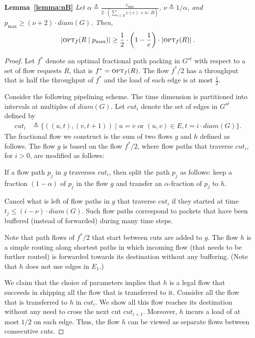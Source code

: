 \documentclass[11pt]{article}
\newcommand{\opt}{\text{\textsc{opt}}}
\newcommand{\pmax}{p_{\max}}
\newcommand{\eqdf}{\triangleq}
\newenvironment{proof sketch}[1]{\noindent {\emph{Proof sketch of #1:}}}{\hfill \qed}
\newcommand{\cut}{\textit{cut}}
\newcommand{\diam}{\textit{diam}}
\begin{document}
\textbf{Lemma~\ref{lemma:nB}} \emph{Let $\alpha\eqdf\frac{c_{\min}}{2\cdot
    (\sum_{e\in E} c(e)+n\cdot B)}$, $\nu\eqdf1/\alpha$, and $\pmax\geq
  (\nu+2)\cdot \diam(G)$.  Then, $$|\opt_f(R \mid \pmax)| \geq \frac
  1{2} \cdot \left(1-\frac 1e\right) \cdot |\opt_f(R)|\:.$$}

\begin{proof}
  Let $f^*$ denote an optimal fractional path packing in $G^{st}$ with respect to a set of flow
  requests $R$, that is $f^* = \opt_f(R)$.   The flow $f^*/2$ has a
  throughput that is half the throughput of $f^*$ and the load of each edge
  is at most $\frac {1}{2}$.

  Consider the following pipelining scheme. The time dimension is partitioned into
  intervals at multiples of $\diam(G)$. Let $\cut_i$ denote the set of edges in $G^{st}$ defined by
  \begin{align*}
    \cut_i &\triangleq \{ ((u,t),(v,t+1)) \mid u=v \text { or } (u,v)\in E, t=i\cdot \diam(G)\}.
  \end{align*}
  The fractional flow we construct is the sum of two flows $g$ and $h$
  defined as follows.  The flow $g$ is based on the flow $f^*/2$,
  where flow paths that traverse $\cut_i$, for $i>0$, are modified as
  follows:
  \begin{inparaenum}[(i)]
  \item If a flow path $p_j$ in $g$ traverses $\cut_i$, then split the
    path $p_j$ as follows: keep a fraction $(1-\alpha)$ of $p_j$ in
    the flow $g$ and transfer an $\alpha$-fraction of $p_j$ to $h$.
  \item Cancel what is left of flow paths in $g$ that traverse
    $\cut_i$ if they started at time $t_j\leq (i-\nu) \cdot \diam(G)$.
    Such flow paths correspond to packets that have been buffered
    (instead of forwarded) during many time steps.
  \end{inparaenum}
  Note that path flows of $f^*/2$ that start between cuts are added
  to $g$. The flow $h$ is a simple routing along shortest paths in which incoming
  flow (that needs to be further routed) is forwarded towards its
  destination without any buffering. (Note that $h$ does not use edges in $E_1$.)

  We claim that the choice of parameters implies that $h$ is a legal
  flow that succeeds in shipping all the flow that is transferred to
  it.  Consider all the flow that is transferred to $h$ in $\cut_i$.
  We show all this flow reaches its destination without any need to
  cross the next cut $\cut_{i+1}$.  Moreover, $h$ incurs a load of at
  most $1/2$ on each edge. Thus, the flow $h$ can be viewed as
  separate flows between consecutive cuts.


\end{proof}
\end{document}
